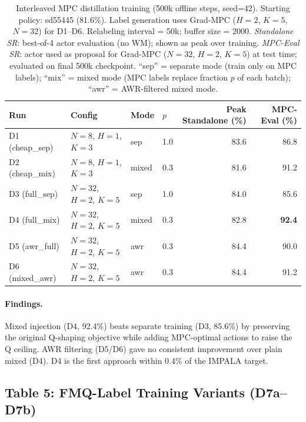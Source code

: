 \documentclass[11pt]{article}
\newcommand{\best}[1]{\textbf{#1}}
\begin{document}
\begin{table}[h]
\centering
\caption{Interleaved MPC distillation training (500k offline steps, seed=42).
  Starting policy: sd55445 (81.6\%).
  Label generation uses Grad-MPC ($H=2$, $K=5$, $N=32$) for D1--D6.
  Relabeling interval = 50k; buffer size = 2000.
  \emph{Standalone SR}: best-of-4 actor evaluation (no WM); shown as peak over training.
  \emph{MPC-Eval SR}: actor used as proposal for Grad-MPC ($N=32$, $H=2$, $K=5$) at test time;
  evaluated on final 500k checkpoint.
  ``sep'' = separate mode (train only on MPC labels);
  ``mix'' = mixed mode (MPC labels replace fraction $p$ of each batch);
  ``awr'' = AWR-filtered mixed mode.}
\begin{tabular}{llllrr}
\toprule
Run & Config & Mode & $p$ & Peak Standalone (\%) & MPC-Eval (\%) \\
\midrule
D1 (cheap\_sep) & $N=8$, $H=1$, $K=3$ & sep   & 1.0 & 83.6 & 86.8 \\
D2 (cheap\_mix) & $N=8$, $H=1$, $K=3$ & mixed & 0.3 & 81.6 & 91.2 \\
D3 (full\_sep)  & $N=32$, $H=2$, $K=5$ & sep  & 1.0 & 84.0 & 85.6 \\
D4 (full\_mix)  & $N=32$, $H=2$, $K=5$ & mixed & 0.3 & 82.8 & \best{92.4} \\
D5 (awr\_full)  & $N=32$, $H=2$, $K=5$ & awr  & 0.3 & 84.4 & 90.0 \\
D6 (mixed\_awr) & $N=32$, $H=2$, $K=5$ & awr  & 0.3 & 84.4 & 91.2 \\
\bottomrule
\end{tabular}
\end{table}

\paragraph{Findings.}
Mixed injection (D4, 92.4\%) beats separate training (D3, 85.6\%) by preserving
the original Q-shaping objective while adding MPC-optimal actions to raise the Q ceiling.
AWR filtering (D5/D6) gave no consistent improvement over plain mixed (D4).
D4 is the first approach within 0.4\% of the IMPALA target.

\subsection*{Table 5: FMQ-Label Training Variants (D7a--D7b)}
\end{document}
